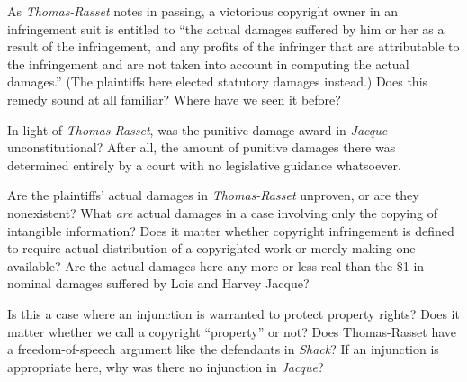 \item As \textit{Thomas\--Rasset} notes in passing, a victorious copyright owner
in an infringement suit is entitled to ``the actual damages suffered by him or
her as a result of the infringement, and any profits of the infringer that are
attributable to the infringement and are not taken into account in computing
the actual damages.'' (The plaintiffs here elected statutory damages instead.)
Does this remedy sound at all familiar? Where have we seen it before?

\item In light of \textit{Thomas-Rasset}, was the punitive damage award in
\textit{Jacque} unconstitutional? After all, the amount of punitive damages
there was determined entirely by a court with no legislative guidance
whatsoever.

\item Are the plaintiffs' actual damages in \textit{Thomas-Rasset} unproven, or
are they nonexistent? What \textit{are} actual damages in a case involving only
the copying of intangible information? Does it matter whether copyright
infringement is defined to require actual distribution of a copyrighted work or
merely making one available? Are the actual damages here any more or less real
than the \$1 in nominal damages suffered by Lois and Harvey Jacque?

\item Is this a case where an injunction is warranted to protect property
rights? Does it matter whether we call a copyright ``property'' or not? Does
Thomas-Rasset have a freedom-of-speech argument like the defendants in
\textit{Shack}? If an injunction is appropriate here, why was there no
injunction in \textit{Jacque}?

